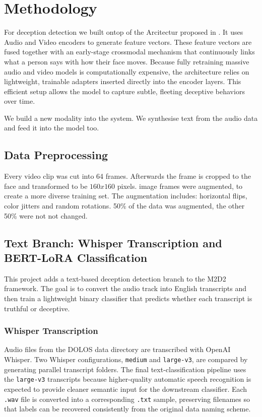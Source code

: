\section{Methodology}
\label{sec:methodology}
For deception detection we built ontop of the Arcitectur proposed in \cite{guo2023audio}. 
It uses Audio and Video encoders to generate feature vectors. These feature vectors are fused together with an early-stage crossmodal 
mechanism that continuously links what a person says with how their face moves. Because fully retraining massive audio and video models 
is computationally expensive, the architecture relies on lightweight, trainable adapters inserted directly into the encoder layers. 
This efficient setup allows the model to capture subtle, fleeting deceptive behaviors over time. 

We build a new modality into the system. We synthesise text from the audio data and feed it into the model too.

\subsection{Data Preprocessing}
Every video clip was cut into 64 frames. Afterwards the frame is cropped to the face and transformed to be $160x160$ pixels.
image frames were augmented, to create a more diverse training set. The augmentation includes: horizontal flips, color jitters and
random rotations. 50\% of the data was augmented, the other 50\% were not not changed.

\subsection{Text Branch: Whisper Transcription and BERT-LoRA Classification}
\label{sec:text_branch_project}

This project adds a text-based deception detection branch to the M2D2 framework. The goal is to convert the audio track into English transcripts and then train a lightweight binary classifier that predicts whether each transcript is truthful or deceptive.

\subsubsection{Whisper Transcription}
Audio files from the DOLOS data directory are transcribed with OpenAI Whisper. Two Whisper configurations, \texttt{medium} and \texttt{large-v3}, are compared by generating parallel transcript folders. The final text-classification pipeline uses the \texttt{large-v3} transcripts because higher-quality automatic speech recognition is expected to provide cleaner semantic input for the downstream classifier. Each \texttt{.wav} file is converted into a corresponding \texttt{.txt} sample, preserving filenames so that labels can be recovered consistently from the original data naming scheme.

